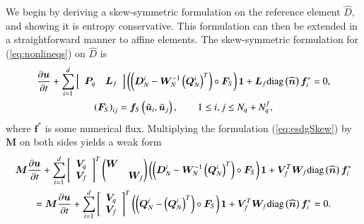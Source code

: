 \documentclass[preprint,10pt]{elsarticle}
\theoremstyle{definition}
\theoremstyle{lemma}
\theoremstyle{corollary}
\theoremstyle{theorem}
\theoremstyle{assumption}
\renewcommand{\hat}[1]{\widehat{#1}}
\newcommand{\pd}[2]{\frac{\partial#1}{\partial#2}}
\newcommand{\LRp}[1]{\left( #1 \right)}
\newcommand{\LRs}[1]{\left[ #1 \right]}
\newcommand{\diag}[1]{{\rm diag}\LRp{#1}}
\begin{document}
We begin by deriving a skew-symmetric formulation on the reference element $\hat{D}$, and showing it is entropy conservative.  This formulation can then be extended in a straightforward manner to affine elements.  The skew-symmetric formulation for (\ref{eq:nonlineqs}) on $\hat{D}$ is 
\begin{gather}
\pd{\bm{u}}{t} + \sum_{i=1}^d \LRs{\begin{array}{cc}
\bm{P}_q & \bm{L}_f\end{array}} \LRp{\LRp{\bm{D}^i_N - \bm{W}_N^{-1}\LRp{\bm{Q}^i_N}^T} \circ \bm{F}_S}\bm{1} + \bm{L}_f \diag{\hat{\bm{n}}}\bm{f}_i^* = 0,\\
\LRp{\bm{F}_S}_{ij} = \bm{f}_S\LRp{\tilde{\bm{u}}_i,\tilde{\bm{u}}_j}, \qquad 1\leq i,j\leq N_q + N^f_q,
\label{eq:esdgSkew}
\end{gather}
where $\bm{f}^*$ is some numerical flux.  Multiplying the formulation (\ref{eq:esdgSkew}) by $\bm{M}$ on both sides yields a weak form 
\begin{gather}
\bm{M}\pd{\bm{u}}{t} + \sum_{i=1}^d \LRs{\begin{array}{c}
\bm{V}_q \\ \bm{V}_f\end{array}}^T \begin{pmatrix}
\bm{W}&\\
&\bm{W}_f
\end{pmatrix}
\LRp{\LRp{\bm{D}^i_N - \bm{W}_N^{-1}\LRp{\bm{Q}^i_N}^T} \circ \bm{F}_S}\bm{1} +  \bm{V}_f^T\bm{W}_f\diag{\hat{\bm{n}}}\bm{f}_i^*\label{eq:esdgSkewWeak}\\
= \bm{M}\pd{\bm{u}}{t} + \sum_{i=1}^d\LRs{\begin{array}{c}
\bm{V}_q \\ \bm{V}_f\end{array}}^T 
\LRp{\LRp{\bm{Q}^i_N - \LRp{\bm{Q}^i_N}^T} \circ \bm{F}_S}\bm{1} + \bm{V}_f^T\bm{W}_f \diag{\hat{\bm{n}}}\bm{f}_i^* = 0.  \nonumber
\end{gather}
\end{document}
